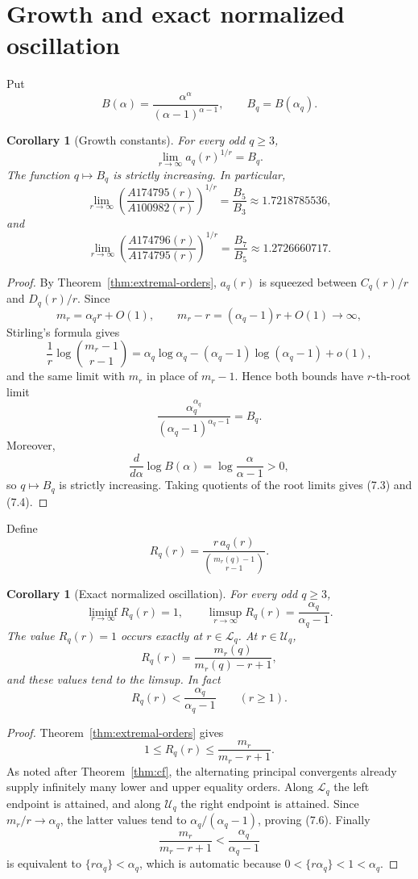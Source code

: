 \documentclass[11pt]{article}
\newtheorem{corollary}[theorem]{Corollary}
\newcommand{\Lq}{\mathcal L}
\newcommand{\Uq}{\mathcal U}
\begin{document}
\section{Growth and exact normalized oscillation}
\label{sec:growth}

Put
\[
 B(\alpha)=
 \frac{\alpha^\alpha}{(\alpha-1)^{\alpha-1}},
 \qquad
 B_q=B(\alpha_q).
 \tag{7.1}
\]

\begin{corollary}[Growth constants]
\label{cor:growth}
For every odd \(q\geq3\),
\[
 \lim_{r\to\infty}a_q(r)^{1/r}=B_q.
 \tag{7.2}
\]
The function \(q\mapsto B_q\) is strictly increasing. In particular,
\[
 \lim_{r\to\infty}
 \left(\frac{A174795(r)}{A100982(r)}\right)^{1/r}
 =\frac{B_5}{B_3}
 \approx1.7218785536,
 \tag{7.3}
\]
and
\[
 \lim_{r\to\infty}
 \left(\frac{A174796(r)}{A174795(r)}\right)^{1/r}
 =\frac{B_7}{B_5}
 \approx1.2726660717.
 \tag{7.4}
\]
\end{corollary}

\begin{proof}
By Theorem~\ref{thm:extremal-orders}, \(a_q(r)\) is squeezed between
\(C_q(r)/r\) and \(D_q(r)/r\). Since
\[
 m_r=\alpha_q r+O(1),
 \qquad
 m_r-r=(\alpha_q-1)r+O(1)\longrightarrow\infty,
\]
Stirling's formula gives
\[
 \frac1r\log\binom{m_r-1}{r-1}
 =
 \alpha_q\log\alpha_q
 -(\alpha_q-1)\log(\alpha_q-1)+o(1),
\]
and the same limit with \(m_r\) in place of \(m_r-1\).  Hence both
bounds have \(r\)-th-root limit
\[
 \frac{\alpha_q^{\alpha_q}}
 {(\alpha_q-1)^{\alpha_q-1}}=B_q.
\]
Moreover,
\[
 \frac{d}{d\alpha}\log B(\alpha)
 =\log\frac{\alpha}{\alpha-1}>0,
\]
so \(q\mapsto B_q\) is strictly increasing. Taking quotients of the root
limits gives (7.3) and (7.4).
\end{proof}

Define
\[
 R_q(r)=
 \frac{r\,a_q(r)}
 {\binom{m_r(q)-1}{r-1}}.
 \tag{7.5}
\]

\begin{corollary}[Exact normalized oscillation]
\label{cor:oscillation}
For every odd \(q\geq3\),
\[
 \liminf_{r\to\infty}R_q(r)=1,
 \qquad
 \limsup_{r\to\infty}R_q(r)
 =\frac{\alpha_q}{\alpha_q-1}.
 \tag{7.6}
\]
The value \(R_q(r)=1\) occurs exactly at \(r\in\Lq_q\). At
\(r\in\Uq_q\),
\[
 R_q(r)=\frac{m_r(q)}{m_r(q)-r+1},
 \tag{7.7}
\]
and these values tend to the limsup. In fact
\[
 R_q(r)<\frac{\alpha_q}{\alpha_q-1}
 \qquad(r\geq1).
 \tag{7.8}
\]
\end{corollary}

\begin{proof}
Theorem~\ref{thm:extremal-orders} gives
\[
 1\leq R_q(r)\leq\frac{m_r}{m_r-r+1}.
\]
As noted after Theorem~\ref{thm:cf}, the alternating principal
convergents already supply infinitely many lower and upper equality
orders. Along \(\Lq_q\) the left endpoint is attained, and along
\(\Uq_q\) the right endpoint is attained. Since \(m_r/r\to\alpha_q\),
the latter values tend to \(\alpha_q/(\alpha_q-1)\), proving (7.6).
Finally
\[
 \frac{m_r}{m_r-r+1}<\frac{\alpha_q}{\alpha_q-1}
\]
is equivalent to \(\{r\alpha_q\}<\alpha_q\), which is automatic because
\(0<\{r\alpha_q\}<1<\alpha_q\).
\end{proof}
\end{document}
